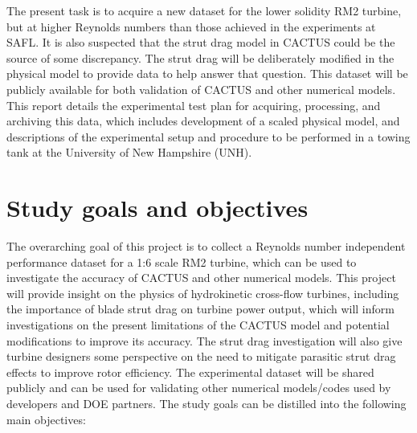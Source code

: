 \documentclass[12pt,letterpaper]{scrreprt}
\begin{document}
The present task is to acquire a new dataset for the lower solidity RM2 turbine,
but at higher Reynolds numbers than those achieved in the experiments at SAFL.
It is also suspected that the strut drag model in CACTUS could be the source of
some discrepancy. The strut drag will be deliberately modified in the physical
model to provide data to help answer that question. This dataset will be
publicly available for both validation of CACTUS and other numerical models.
This report details the experimental test plan for acquiring, processing, and
archiving this data, which includes development of a scaled physical model, and
descriptions of the experimental setup and procedure to be performed in a towing
tank at the University of New Hampshire (UNH).


\section{Study goals and objectives}

The overarching goal of this project is to collect a Reynolds number independent
performance dataset for a 1:6 scale RM2 turbine, which can be used to
investigate the accuracy of CACTUS and other numerical models. This project will
provide insight on the physics of hydrokinetic cross-flow turbines, including
the importance of blade strut drag on turbine power output, which will inform
investigations on the present limitations of the CACTUS model and potential
modifications to improve its accuracy.  The strut drag investigation will also
give turbine designers some perspective on the need to mitigate parasitic strut
drag effects to improve rotor efficiency. The experimental dataset will be
shared publicly and can be used for validating other numerical models/codes used
by developers and DOE partners. The study goals can be distilled into the
following main objectives:
\end{document}
